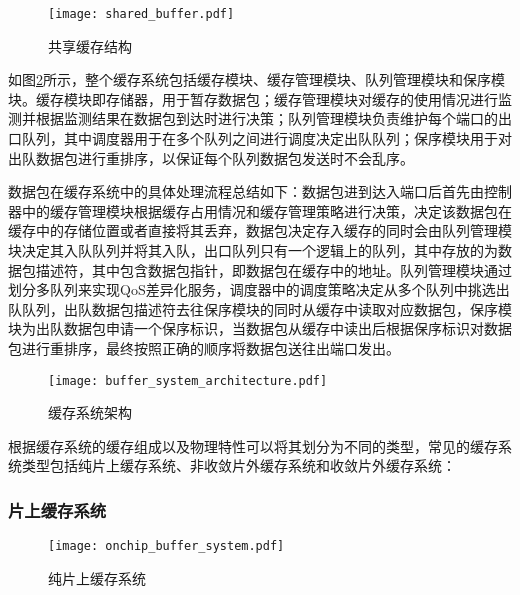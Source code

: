 \begin{figure}[H]
  \centering
  \texttt{[image: shared\_buffer.pdf]}
  \caption{共享缓存结构}
  \label{fig:c2:shared buffer structure}
\end{figure}


如图\ref{fig:c2:buffer system architecture}所示，整个缓存系统包括缓存模块、缓存管理模块、队列管理模块和保序模块。缓存模块即存储器，用于暂存数据包；缓存管理模块对缓存的使用情况进行监测并根据监测结果在数据包到达时进行决策；队列管理模块负责维护每个端口的出口队列，其中调度器用于在多个队列之间进行调度决定出队队列；保序模块用于对出队数据包进行重排序，以保证每个队列数据包发送时不会乱序。

数据包在缓存系统中的具体处理流程总结如下：数据包进到达入端口后首先由控制器中的缓存管理模块根据缓存占用情况和缓存管理策略进行决策，决定该数据包在缓存中的存储位置或者直接将其丢弃，数据包决定存入缓存的同时会由队列管理模块决定其入队队列并将其入队，出口队列只有一个逻辑上的队列，其中存放的为数据包描述符，其中包含数据包指针，即数据包在缓存中的地址。队列管理模块通过划分多队列来实现QoS差异化服务，调度器中的调度策略决定从多个队列中挑选出队队列，出队数据包描述符去往保序模块的同时从缓存中读取对应数据包，保序模块为出队数据包申请一个保序标识，当数据包从缓存中读出后根据保序标识对数据包进行重排序，最终按照正确的顺序将数据包送往出端口发出。

\begin{figure}[H]
  \centering
  \texttt{[image: buffer\_system\_architecture.pdf]}
  \caption{缓存系统架构}
  \label{fig:c2:buffer system architecture}
\end{figure}



根据缓存系统的缓存组成以及物理特性可以将其划分为不同的类型，常见的缓存系统类型包括纯片上缓存系统、非收敛片外缓存系统和收敛片外缓存系统：

\subsubsection{片上缓存系统}

\begin{figure}[H]
  \centering
  \texttt{[image: onchip\_buffer\_system.pdf]}
  \caption{纯片上缓存系统}
  \label{fig:c2:on-chip buffer system}
\end{figure}


